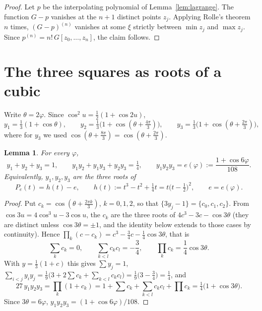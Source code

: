 \documentclass[11pt]{amsart}
\newtheorem{lemma}[theorem]{Lemma}
\theoremstyle{remark}
\begin{document}
\begin{proof}
Let $p$ be the interpolating polynomial of Lemma~\ref{lem:lagrange}. The function
$G-p$ vanishes at the $n+1$ distinct points $z_j$. Applying Rolle's theorem $n$ times,
$(G-p)^{(n)}$ vanishes at some $\xi$ strictly between $\min z_j$ and $\max z_j$. Since
$p^{(n)}=n!\,G[z_0,\dots,z_n]$, the claim follows.
\end{proof}

\section{The three squares as roots of a cubic}

Write $\theta=2\varphi$. Since $\cos^2 u=\frac12(1+\cos 2u)$,
\begin{equation}\label{eq:y}
y_1=\tfrac13(1+\cos\theta),\qquad
y_2=\tfrac13\bigl(1+\cos(\theta+\tfrac{4\pi}{3})\bigr),\qquad
y_3=\tfrac13\bigl(1+\cos(\theta+\tfrac{2\pi}{3})\bigr),
\end{equation}
where for $y_3$ we used $\cos(\theta+\frac{8\pi}3)=\cos(\theta+\frac{2\pi}3)$.

\begin{lemma}\label{lem:cubic}
For every $\varphi$,
\[
y_1+y_2+y_3=1,\qquad y_1y_2+y_1y_3+y_2y_3=\tfrac14,\qquad
y_1y_2y_3=e(\varphi):=\frac{1+\cos 6\varphi}{108}.
\]
Equivalently, $y_1,y_2,y_3$ are the three roots of
\[
P_{e}(t)=h(t)-e,\qquad h(t):=t^3-t^2+\tfrac14 t=t\bigl(t-\tfrac12\bigr)^2,
\qquad e=e(\varphi).
\]
\end{lemma}

\begin{proof}
Put $c_k=\cos(\theta+\frac{2\pi k}{3})$, $k=0,1,2$, so that $\{3y_j-1\}=\{c_0,c_1,c_2\}$.
From $\cos3u=4\cos^3u-3\cos u$, the $c_k$ are the three roots of
$4c^3-3c-\cos3\theta$ (they are distinct unless $\cos 3\theta=\pm1$, and the identity
below extends to those cases by continuity). Hence
$\prod_k(c-c_k)=c^3-\frac34c-\frac14\cos3\theta$, that is
\[
\textstyle\sum_k c_k=0,\qquad\sum_{k<l}c_kc_l=-\frac34,\qquad
\prod_k c_k=\frac14\cos3\theta .
\]
With $y=\frac13(1+c)$ this gives $\sum y_j=1$,
$\sum_{i<j}y_iy_j=\frac19\bigl(3+2\sum c_k+\sum_{k<l}c_kc_l\bigr)=\frac19\bigl(3-\frac34\bigr)=\frac14$, and
\[
27\,y_1y_2y_3=\prod_k(1+c_k)=1+\sum c_k+\sum_{k<l}c_kc_l+\prod c_k
=\tfrac14\bigl(1+\cos 3\theta\bigr).
\]
Since $3\theta=6\varphi$, $y_1y_2y_3=(1+\cos6\varphi)/108$.
\end{proof}
\end{document}
